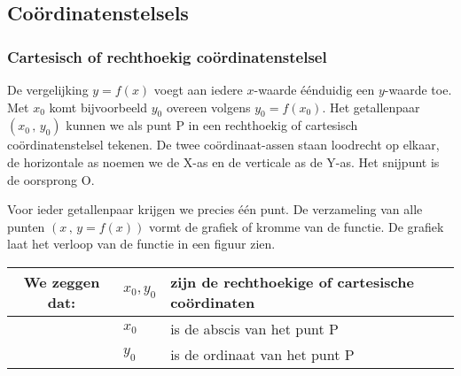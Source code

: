 


\subsection{Co\"ordinatenstelsels}


\subsubsection{Cartesisch of rechthoekig co\"ordinatenstelsel}

De vergelijking $y=f(x)$ voegt aan iedere $x$-waarde \'e\'enduidig een
$y$-waarde toe. Met $x_{0}$ komt bijvoorbeeld $y_{0}$ overeen volgens
$y_{0}=f(x_{0})$. Het getallenpaar $(x_{0}\,,\,y_{0})$ kunnen we
als punt P in een rechthoekig of cartesisch co\"ordinatenstelsel tekenen.
De twee co\"ordinaat-assen staan loodrecht op elkaar, de horizontale
as noemen we de X-as en de verticale as de Y-as. Het snijpunt is de
oorsprong O.

\noindent Voor ieder getallenpaar krijgen we precies \'e\'en punt. De
verzameling van alle punten $(x\,,\,y=f(x))$ vormt de grafiek of
kromme van de functie. De grafiek laat het verloop van de functie
in een figuur zien.


\begin{table}
	\centering
\begin{tabular}{|c|l|l|}
	\hline 
	We zeggen dat: & $x_{0},y_{0}$  & zijn de rechthoekige of cartesische co\"ordinaten\\
	\hline 
	& $x_{0}$  & is de abscis van het punt P\\
	\hline 
	& $y_{0}$ & is de ordinaat van het punt P\\
	\hline 
\end{tabular}
\end{table}


